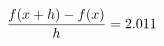 \documentclass[preview]{standalone}
\begin{document}
\begin{align*}
\special{dvisvgm:raw <g id='unique000'>}\frac{f(x+h)-f(x)}{h} = 2.011\special{dvisvgm:raw </g>}
\end{align*}
\end{document}
